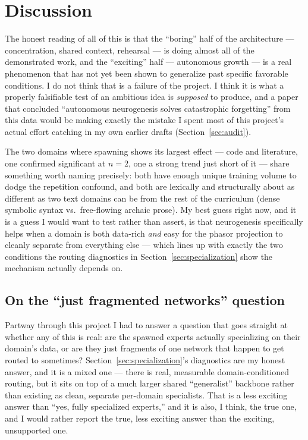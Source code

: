 \documentclass[11pt,letterpaper]{article}
\begin{document}
\section{Discussion}
\label{sec:discussion}

The honest reading of all of this is that the ``boring'' half of the architecture --- concentration, shared context, rehearsal --- is doing almost all of the demonstrated work, and the ``exciting'' half --- autonomous growth --- is a real phenomenon that has not yet been shown to generalize past specific favorable conditions. I do not think that is a failure of the project. I think it is what a properly falsifiable test of an ambitious idea is \emph{supposed} to produce, and a paper that concluded ``autonomous neurogenesis solves catastrophic forgetting'' from this data would be making exactly the mistake I spent most of this project's actual effort catching in my own earlier drafts (Section~\ref{sec:audit}).

The two domains where spawning shows its largest effect --- code and literature, one confirmed significant at $n=2$, one a strong trend just short of it --- share something worth naming precisely: both have enough unique training volume to dodge the repetition confound, and both are lexically and structurally about as different as two text domains can be from the rest of the curriculum (dense symbolic syntax vs.\ free-flowing archaic prose). My best guess right now, and it is a guess I would want to test rather than assert, is that neurogenesis specifically helps when a domain is both data-rich \emph{and} easy for the phasor projection to cleanly separate from everything else --- which lines up with exactly the two conditions the routing diagnostics in Section~\ref{sec:specialization} show the mechanism actually depends on.

\subsection*{On the ``just fragmented networks'' question}

Partway through this project I had to answer a question that goes straight at whether any of this is real: are the spawned experts actually specializing on their domain's data, or are they just fragments of one network that happen to get routed to sometimes? Section~\ref{sec:specialization}'s diagnostics are my honest answer, and it is a mixed one --- there is real, measurable domain-conditioned routing, but it sits on top of a much larger shared ``generalist'' backbone rather than existing as clean, separate per-domain specialists. That is a less exciting answer than ``yes, fully specialized experts,'' and it is also, I think, the true one, and I would rather report the true, less exciting answer than the exciting, unsupported one.
\label{sec:related-work-anchor}
\end{document}
